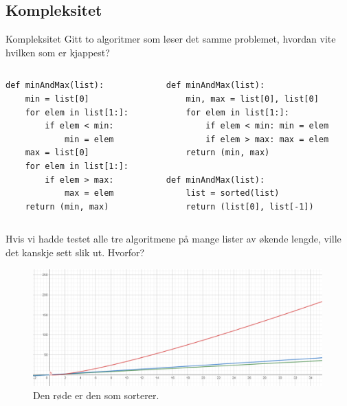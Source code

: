\subsection{Kompleksitet}
\begin{frame}[fragile]{Kompleksitet}
    Gitt to algoritmer som løser det samme problemet, hvordan vite hvilken som er kjappest?
    \begin{columns}
        \begin{column}{0.45\textwidth}
            \begin{verbatim}
def minAndMax(list):
    min = list[0]
    for elem in list[1:]:
        if elem < min:
            min = elem
    max = list[0]
    for elem in list[1:]:
        if elem > max:
            max = elem
    return (min, max)
            \end{verbatim}
        \end{column}
        \pause
        \begin{column}{0.45\textwidth}
            \begin{verbatim}
def minAndMax(list):
    min, max = list[0], list[0]
    for elem in list[1:]:
        if elem < min: min = elem
        if elem > max: max = elem
    return (min, max)
    
def minAndMax(list):
    list = sorted(list)
    return (list[0], list[-1])
            \end{verbatim}
        \end{column}
    \end{columns}    
\end{frame}
\begin{frame}[fragile]{}
    Hvis vi hadde testet alle tre algoritmene på mange lister av økende lengde, ville det kanskje sett slik ut. Hvorfor?
    \begin{figure}
        \centering
        \includegraphics[height = 4.5cm]{images/minmax.png}
        \caption{Den røde er den som sorterer.}
        \label{fig:minmax}
    \end{figure}    
\end{frame}

